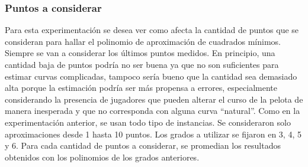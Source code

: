 \subsubsection{Puntos a considerar}
Para esta experimentación se desea ver como afecta la cantidad de puntos que se consideran para hallar el polinomio de aproximación de 
cuadrados mínimos. Siempre se van a considerar los últimos puntos medidos. En principio, una cantidad baja de puntos podría no ser 
buena ya que no son suficientes para estimar curvas complicadas, tampoco sería bueno que la cantidad sea demasiado alta porque la 
estimación podría ser más propensa a errores, especialmente considerando la presencia de jugadores que pueden alterar el curso de la 
pelota de manera inesperada y que no corresponda con alguna curva ``natural''. Como en la experimentación anterior, se usan todo tipo 
de instancias. Se consideraron solo aproximaciones desde 1 hasta 10 puntos. Los grados a utilizar se fijaron en 3, 4, 5 y 6. Para cada cantidad de puntos a considerar, se promedian los resultados obtenidos con los polinomios de los grados anteriores.




